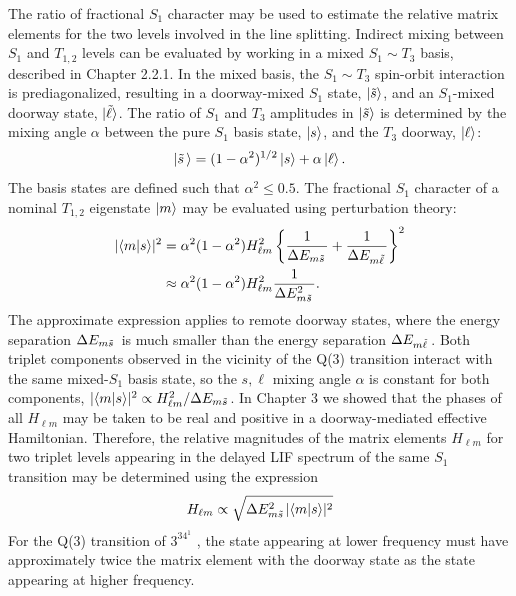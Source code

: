 \documentclass[12pt]{mitthesis}
\begin{document}
The ratio of fractional $S_1$ character may be used to estimate the
relative matrix elements for the two levels involved in the line
splitting.  Indirect mixing between $S_1$ and $T_{1,2}$ levels can be
evaluated by working in a mixed $S_1 \sim T_3$ basis, described in
Chapter 2.2.1.  In the mixed basis, the $S_1 \sim T_3$ spin-orbit
interaction is prediagonalized, resulting in a doorway-mixed $S_1$
state, $\mathinner{|{\tilde{s}}\rangle}$, and an $S_1$-mixed doorway state,
$\mathinner{|{\tilde{\ell}}\rangle}$.  The ratio of $S_1$ and $T_3$ amplitudes in
$\mathinner{|{\tilde{s}}\rangle}$ is determined by the mixing angle $\alpha$ between
the pure $S_1$ basis state, $\mathinner{|{s}\rangle}$, and the $T_3$ doorway,
$\mathinner{|{\ell}\rangle}$:
\begin{equation}
  \mathinner{|{\tilde{s}\,}\rangle} = (1-\alpha^2)^{1/2} \mathinner{|{s}\rangle} + \alpha \mathinner{|{\ell}\rangle}.
\end{equation}
The basis states are defined such that $\alpha^2 \leq 0.5$.
The fractional $S_1$ character of a nominal $T_{1,2}$ eigenstate
$\mathinner{|{m}\rangle}$ may be evaluated using perturbation theory:
\begin{equation}
  \label{eq:s-char}
  \begin{split}
    \lvert \mathinner{\langle{m|s}\rangle} \rvert^2 
    &= \alpha^2 (1-\alpha^2) H_{\ell m}^2
    \left \lbrace 
      \frac{1}{\Delta E_{m \tilde{s}\,}} +
      \frac{1}{\Delta E_{m \tilde{\ell}\,}}
    \right \rbrace ^2\\
    &\approx \alpha^2 (1-\alpha^2) H_{\ell m}^2
    \frac{1}{\Delta E_{m \tilde{s}\,}^2}.
  \end{split}
\end{equation}
The approximate expression applies to remote doorway states, where the
energy separation $\Delta E_{m \tilde{s}\,}$ is much smaller than the energy
separation $\Delta E_{m \tilde{\ell}\,}$.  Both triplet components observed in
the vicinity of the Q(3) transition interact with the same mixed-$S_1$
basis state, so the $s,\ell$ mixing angle $\alpha$ is constant for
both components, $\lvert \mathinner{\langle{m|s}\rangle} \rvert^2 \propto H_{\ell m}^2 /
\Delta E_{m \tilde{s}\,}$.  In Chapter 3 we showed that the phases of all
$H_{\ell m}$ may be taken to be real and positive in a
doorway-mediated effective Hamiltonian.  Therefore, the relative
magnitudes of the matrix elements $H_{\ell m}$ for two triplet levels
appearing in the delayed LIF spectrum of the same $S_1$ transition may
be determined using the expression
\begin{equation}
  \label{eq:approx-hlm}
  H_{\ell m} \propto \sqrt{ \Delta E_{m \tilde{s}\,}^2 \lvert \mathinner{\langle{m|s}\rangle} \rvert^2 }
\end{equation}
For the Q(3) transition of $3^34^1$ , the state appearing at
lower frequency must have approximately twice the matrix element with
the doorway state as the state appearing at higher frequency.
\end{document}
